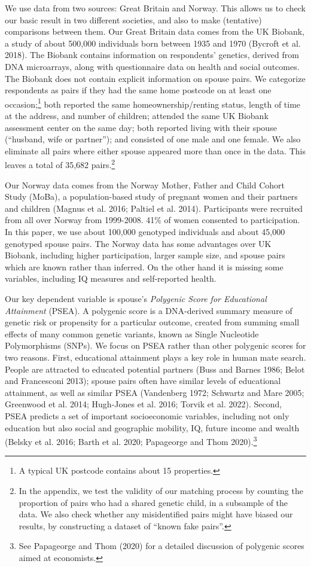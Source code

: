 \documentclass[
  12pt,
]{article}
\theoremstyle{definition}
\theoremstyle{definition}
\theoremstyle{definition}
\theoremstyle{definition}
\theoremstyle{remark}
\begin{document}
We use data from two sources: Great Britain and Norway. This allows us
to check our basic result in two different societies, and also to make
(tentative) comparisons between them. Our Great Britain data comes from
the UK Biobank, a study of about 500,000 individuals born between 1935
and 1970 ({Bycroft et al.} 2018). The Biobank contains information on
respondents' genetics, derived from DNA microarrays, along with
questionnaire data on health and social outcomes. The Biobank does not
contain explicit information on spouse pairs. We categorize respondents
as pairs if they had the same home postcode on at least one
occasion;\footnote{A typical UK postcode contains about 15 properties.} both reported the same homeownership/renting status,
length of time at the address, and number of children; attended the same
UK Biobank assessment center on the same day; both reported living with
their spouse (``husband, wife or partner''); and consisted of one male and
one female. We also eliminate all pairs where either spouse appeared
more than once in the data. This leaves a total of
35,682 pairs.\footnote{In the appendix, we test the validity of our matching process by
  counting the proportion of pairs who had a shared genetic child, in
  a subsample of the data. We also check whether any misidentified
  pairs might have biased our results, by constructing a dataset of
  ``known fake pairs''.}

Our Norway data comes from the Norway Mother, Father and Child Cohort
Study (MoBa), a population-based study of pregnant women and their
partners and children ({Magnus et al.} 2016; Paltiel et al. 2014).
Participants were recruited from all over Norway from 1999-2008. 41\% of
women consented to participation. In this paper, we use about 100,000
genotyped individuals and about 45,000 genotyped spouse pairs. The
Norway data has some advantages over UK Biobank, including higher
participation, larger sample size, and spouse pairs which are known
rather than inferred. On the other hand it is missing some variables,
including IQ measures and self-reported health.

Our key dependent variable is spouse's \emph{Polygenic Score for Educational
Attainment} (PSEA). A polygenic score is a DNA-derived summary measure
of genetic risk or propensity for a particular outcome, created from
summing small effects of many common genetic variants, known as Single
Nucleotide Polymorphisms (SNPs). We focus on PSEA rather than other
polygenic scores for two reasons. First, educational attainment plays a
key role in human mate search. People are attracted to educated
potential partners (Buss and Barnes 1986; Belot and Francesconi 2013); spouse
pairs often have similar levels of educational attainment, as well as
similar PSEA (Vandenberg 1972; Schwartz and Mare 2005; Greenwood et al. 2014; Hugh-Jones et al. 2016; {Torvik et al.} 2022). Second,
PSEA predicts a set of important socioeconomic variables, including not
only education but also social and geographic mobility, IQ, future
income and wealth ({Belsky et al.} 2016; Barth et al. 2020; Papageorge and Thom 2020).\footnote{See Papageorge and Thom (2020) for a detailed discussion of polygenic
  scores aimed at economists.}
\end{document}
